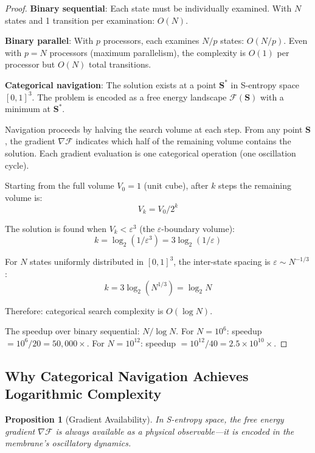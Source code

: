 \documentclass[twocolumn,10pt]{article}
\newtheorem{proposition}[theorem]{Proposition}
\theoremstyle{remark}
\newcommand{\eps}{\varepsilon}
\newcommand{\Scoord}{\mathbf{S}}
\begin{document}
\begin{proof}
\textbf{Binary sequential}: Each state must be individually examined. With $N$ states and 1 transition per examination: $O(N)$.

\textbf{Binary parallel}: With $p$ processors, each examines $N/p$ states: $O(N/p)$. Even with $p = N$ processors (maximum parallelism), the complexity is $O(1)$ per processor but $O(N)$ total transitions.

\textbf{Categorical navigation}: The solution exists at a point $\Scoord^*$ in S-entropy space $[0,1]^3$. The problem is encoded as a free energy landscape $\mathcal{F}(\Scoord)$ with a minimum at $\Scoord^*$.

Navigation proceeds by halving the search volume at each step. From any point $\Scoord$, the gradient $\nabla\mathcal{F}$ indicates which half of the remaining volume contains the solution. Each gradient evaluation is one categorical operation (one oscillation cycle).

Starting from the full volume $V_0 = 1$ (unit cube), after $k$ steps the remaining volume is:
\begin{equation}
    V_k = V_0 / 2^k
\end{equation}

The solution is found when $V_k < \eps^3$ (the $\eps$-boundary volume):
\begin{equation}
    k = \log_2(1/\eps^3) = 3\log_2(1/\eps)
\end{equation}

For $N$ states uniformly distributed in $[0,1]^3$, the inter-state spacing is $\eps \sim N^{-1/3}$:
\begin{equation}
    k = 3\log_2(N^{1/3}) = \log_2 N
\end{equation}

Therefore: categorical search complexity is $O(\log N)$.

The speedup over binary sequential: $N / \log N$.
For $N = 10^6$: speedup $= 10^6 / 20 = 50{,}000\times$.
For $N = 10^{12}$: speedup $= 10^{12} / 40 = 2.5 \times 10^{10}\times$.
\end{proof}

\subsection{Why Categorical Navigation Achieves Logarithmic Complexity}

\begin{proposition}[Gradient Availability]
\label{prop:gradient}
In S-entropy space, the free energy gradient $\nabla\mathcal{F}$ is always available as a physical observable---it is encoded in the membrane's oscillatory dynamics.
\end{proposition}
\end{document}

